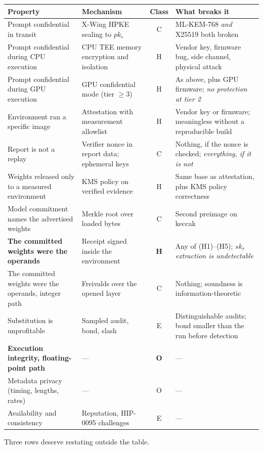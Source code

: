 \documentclass[11pt]{article}
\begin{document}
\begin{center}
\small
\begin{tabular}{@{}L{0.30\textwidth}L{0.30\textwidth}cL{0.26\textwidth}@{}}
\toprule
Property & Mechanism & Class & What breaks it \\
\midrule
Prompt confidential in transit & X-Wing HPKE sealing to $pk_e$ & C & ML-KEM-768 \emph{and} X25519
both broken \\
Prompt confidential during CPU execution & CPU TEE memory encryption and isolation & H & Vendor key,
firmware bug, side channel, physical attack \\
Prompt confidential during GPU execution & GPU confidential mode (tier $\geq 3$) & H & As above, plus
GPU firmware; \emph{no protection at tier 2} \\
Environment ran a specific image & Attestation with measurement allowlist & H & Vendor key or
firmware; meaningless without a reproducible build \\
Report is not a replay & Verifier nonce in report data; ephemeral keys & C & Nothing, if the nonce is
checked; \emph{everything, if it is not} \\
Weights released only to a measured environment & KMS policy on verified evidence & H & Same base as
attestation, plus KMS policy correctness \\
Model commitment names the advertised weights & Merkle root over loaded bytes & C & Second preimage
on keccak \\
\textbf{The committed weights were the operands} & Receipt signed inside the environment & \textbf{H}
& Any of (H1)--(H5); \emph{$sk_r$ extraction is undetectable} \\
The committed weights were the operands, integer path & Freivalds over the opened layer & C &
Nothing; soundness is information-theoretic \\
Substitution is unprofitable & Sampled audit, bond, slash & E & Distinguishable audits; bond smaller
than the run before detection \\
\textbf{Execution integrity, floating-point path} & --- & \textbf{O} & --- \\
Metadata privacy (timing, lengths, rates) & --- & O & --- \\
Availability and consistency & Reputation, HIP-0095 challenges & E & --- \\
\bottomrule
\end{tabular}
\end{center}

Three rows deserve restating outside the table.
\end{document}
